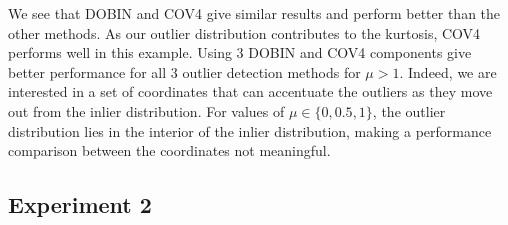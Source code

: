 \documentclass[letter,12pt]{article}
\begin{document}
{\color{blue} We see that DOBIN and COV4 give similar results and perform better than the other methods. As our outlier distribution contributes to the kurtosis, COV4 performs well in this example. }
Using $3$ DOBIN {\color{blue} and COV4 } components give {\color{blue} better }  performance for all $3$ outlier detection methods for $\mu > 1$. Indeed, we are interested in a set of coordinates that can accentuate the outliers as they move out from the inlier distribution. For values of $\mu \in \{0, 0.5, 1\}$, the outlier distribution lies in the interior of the inlier distribution, making a performance comparison between the coordinates not meaningful.

\subsection{Experiment 2}
\end{document}
